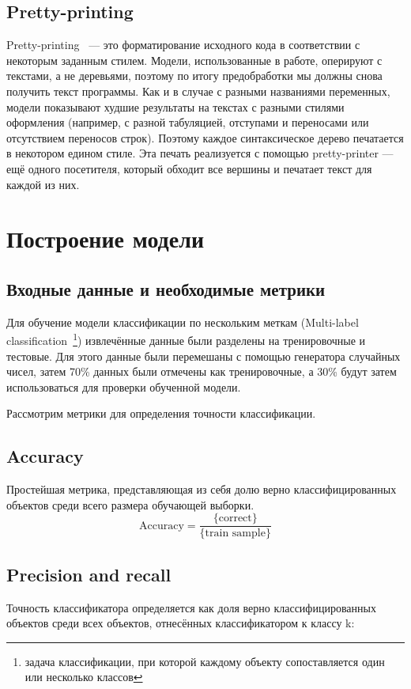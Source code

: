 \documentclass[14pt]{matmex-diploma-custom}
\begin{document}
\subsection*{Pretty-printing}
Pretty-printing~\cite{pretty-printing} --- это форматирование исходного кода в соответствии с некоторым заданным стилем. Модели, использованные в работе, оперируют с текстами, а не деревьями, поэтому по итогу предобработки мы должны снова получить текст программы. Как и в случае с разными названиями переменных, модели показывают худшие результаты на текстах с разными стилями оформления (например, с разной табуляцией, отступами и переносами или отсутствием переносов строк). Поэтому каждое синтаксическое дерево печатается в некотором едином стиле. Эта печать реализуется с помощью pretty-printer --- ещё одного посетителя, который обходит все вершины и печатает текст для каждой из них.

\section{Построение модели}
\subsection{Входные данные и необходимые метрики}
Для обучение модели классификации по нескольким меткам (Multi-label classification~\footnote{задача классификации, при которой каждому объекту сопоставляется один или несколько классов}) извлечённые данные были разделены на тренировочные и тестовые. Для этого данные были перемешаны с помощью генератора случайных чисел, затем 70\% данных были отмечены как тренировочные, а 30\% будут затем использоваться для проверки обученной модели.

Рассмотрим метрики для определения точности классификации.

\subsection*{Accuracy}

Простейшая метрика, представляющая из себя долю верно классифицированных объектов среди всего размера обучающей выборки.
\[
\text{Accuracy}=\frac{\{\text{correct}\}}{\{\text{train sample}\}}
\]

\subsection*{Precision and recall}

Точность классификатора определяется как доля верно классифицированных объектов среди всех объектов, отнесённых классификатором к классу k:
\end{document}
